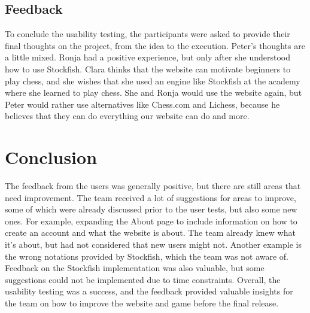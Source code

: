 
\subsection{Feedback}\label{subsec:feedback}

To conclude the usability testing, the participants were asked to provide their final thoughts on the project, from the
idea to the execution.
Peter's thoughts are a little mixed.
Ronja had a positive experience, but only after she understood how to use Stockfish.
Clara thinks that the website can motivate beginners to play chess, and she wishes that she used an engine like
Stockfish
at the academy where she learned to play chess.
She and Ronja would use the website again, but Peter would rather use alternatives like Chess.com and Lichess, because
he believes that they can do everything our website can do and more.



\section{Conclusion}\label{sec:tests-conclusion}

The feedback from the users was generally positive, but there are still areas that need improvement.
The team received a lot of suggestions for areas to improve, some of which were already discussed prior to the user
tests, but also some new ones.
For example, expanding the About page to include information on how to create an account and what the website is about.
The team already knew what it's about, but had not considered that new users might not.
Another example is the wrong notations provided by Stockfish, which the team was not aware of.
Feedback on the Stockfish implementation was also valuable, but some suggestions could not be implemented due to time
constraints.
Overall, the usability testing was a success,
and the feedback provided valuable insights for the team on how to improve the website and game before the final
release.
